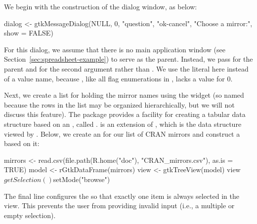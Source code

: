 \documentclass[article,shortnames]{jss}
\begin{document}
We begin with the construction of the dialog window, as below:
\begin{Code}
dialog <- gtkMessageDialog(NULL, 0, "question", "ok-cancel", 
                            "Choose a mirror:", show = FALSE)
\end{Code}
For this dialog,
we assume that there is no main application window (see Section~\ref{sec:spreadsheet-example}) to serve as the
parent. 
Instead, we pass  for the parent and  
for the second argument rather than . We
use the literal  here instead of a value name, because
, like all flag enumerations in , lacks
a value for $0$.

Next, we create a list for holding the mirror names using the
widget (so named because the rows in the list may be organized
hierarchically, but we will not discuss this feature). 
The  package provides a facility for creating a tabular
data structure based on an  ,
called .  is an extension of
, which is the data structure viewed by
. Below, we create an  for our
list of CRAN mirrors and construct a  based on it:
\begin{Code}
mirrors <- read.csv(file.path(R.home("doc"), "CRAN_mirrors.csv"),
                     as.is = TRUE)
model <- rGtkDataFrame(mirrors)
view <- gtkTreeView(model)
view$getSelection()$setMode("browse")
\end{Code}
The final line configures the  so that exactly one
item is always selected in the view. This prevents the user from
providing invalid input (i.e., a multiple or empty selection). 
\end{document}
